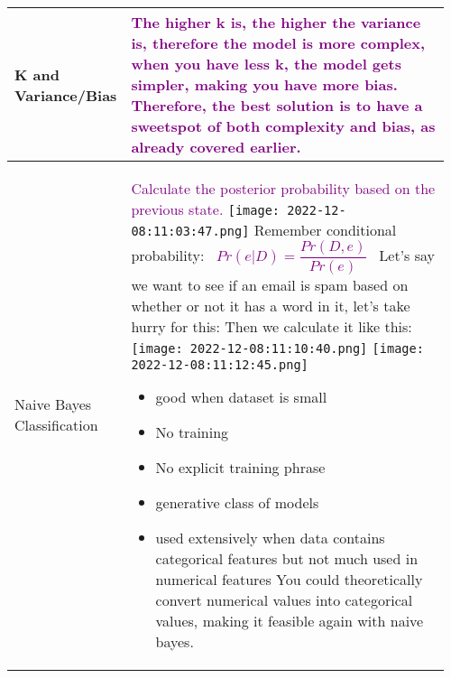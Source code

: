 \documentclass[main.tex,fontsize=8pt,paper=a4,paper=portrait,DIV=calc,]{scrartcl}
\begin{document}
\begin{table}[ht!]
\begin{tabular}{|m{0.2\linewidth}|m{0.755\linewidth}|}
\hline
K and Variance/Bias & 
\textcolor{purple}{\textbf{The higher k} is, the \textbf{higher the variance} is, therefore the \textbf{model is more complex}, when you have \textbf{less k, the model gets simpler}, making you have \textbf{more bias}.\newline
Therefore, the best solution is to have a sweetspot of both complexity and bias, as already covered earlier.}
\\
\hline
Naive Bayes Classification & 
\textcolor{purple}{Calculate the posterior probability based on the previous state.}\newline
\texttt{[image: 2022-12-08:11:03:47.png]}\newline
Remember conditional probability:\newline
\, \newline
\large \textcolor{purple}{\( Pr(e | D) = \dfrac{Pr(D,e)}{Pr(e)} \)}\newline
\normalsize \, \newline
Let's say we want to see if an email is spam based on whether or not it has a word in it, let's take hurry for this:\newline
Then we calculate it like this:\newline
\texttt{[image: 2022-12-08:11:10:40.png]}\newline
\texttt{[image: 2022-12-08:11:12:45.png]}\newline
\begin{itemize}
\item \textcolor{OliveGreen}{good when dataset is small}
\item \textcolor{OliveGreen}{No training}
\item \textcolor{OliveGreen}{No explicit training phrase}
\item \textcolor{OliveGreen}{generative class of models}
\item \textcolor{OliveGreen}{used extensively when data contains categorical features but not much used in numerical features}\newline
You could theoretically convert numerical values into categorical values, making it feasible again with naive bayes.
\vspace{-3mm}
\end{itemize} 
\\
\hline
\end{tabular}

\end{table}
\end{document}
